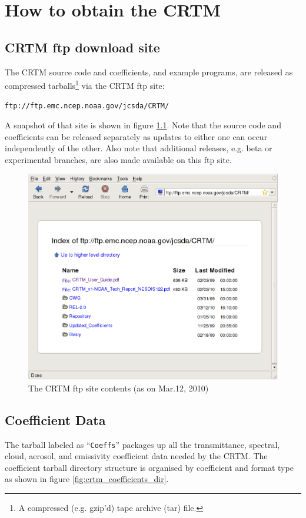\chapter{How to obtain the CRTM}

\section{CRTM ftp download site}
The CRTM source code and coefficients, and example programs, are released as compressed tarballs\footnote{A compressed (e.g. gzip'd) tape archive (tar) file.} via the CRTM ftp site:

\hspace{1cm}\texttt{ftp://ftp.emc.ncep.noaa.gov/jcsda/CRTM/}

A snapshot of that site is shown in figure \ref{fig:ftp_site}. Note that the source code and coefficients can be released separately as updates to either one can occur independently of the other. Also note that additional releases, e.g. beta or experimental branches, are also made available on this ftp site.

\begin{figure}[htb]
  \centering
  \includegraphics[scale=0.5]{graphics/Get/CRTM_ftp_site.eps}
  \caption{The CRTM ftp site contents (as on Mar.12, 2010)}
  \label{fig:ftp_site}
\end{figure}

\section{Coefficient Data}
The tarball labeled as ``\texttt{Coeffs}'' packages up all the transmittance, spectral, cloud, aerosol, and emissivity coefficient data needed by the CRTM. The coefficient tarball directory structure is organised by coefficient and format type as shown in figure \ref{fig:crtm_coefficients_dir}.

